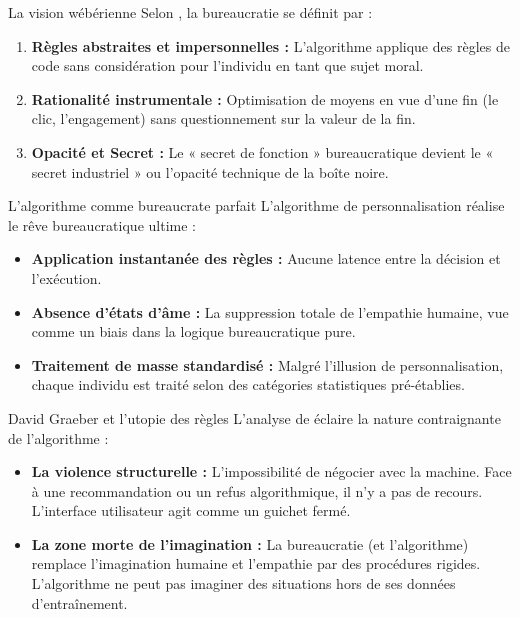 \documentclass[9pt, aspectratio=169]{beamer}
\begin{document}
\begin{frame}{La vision wébérienne}
    Selon \cite{Weber2007The}, la bureaucratie se définit par :
    \begin{enumerate}
        \item \textbf{Règles abstraites et impersonnelles :} L'algorithme applique des règles de code sans considération pour l'individu en tant que sujet moral.
        \item \textbf{Rationalité instrumentale :} Optimisation de moyens en vue d'une fin (le clic, l'engagement) sans questionnement sur la valeur de la fin.
        \item \textbf{Opacité et Secret :} Le « secret de fonction » bureaucratique devient le « secret industriel » ou l'opacité technique de la boîte noire.
    \end{enumerate}
\end{frame}

\begin{frame}{L'algorithme comme bureaucrate parfait}
    L'algorithme de personnalisation réalise le rêve bureaucratique ultime :
    \vspace{0.5cm}
    \begin{itemize}
        \item \textbf{Application instantanée des règles :} Aucune latence entre la décision et l'exécution.
        \item \textbf{Absence d'états d'âme :} La suppression totale de l'empathie humaine, vue comme un biais dans la logique bureaucratique pure.
        \item \textbf{Traitement de masse standardisé :} Malgré l'illusion de personnalisation, chaque individu est traité selon des catégories statistiques pré-établies.
    \end{itemize}
\end{frame}

\begin{frame}{David Graeber et l'utopie des règles}
    L'analyse de \cite{Graeber2015} éclaire la nature contraignante de l'algorithme :
    \begin{itemize}
        \item \textbf{La violence structurelle :} L'impossibilité de négocier avec la machine. Face à une recommandation ou un refus algorithmique, il n'y a pas de recours. L'interface utilisateur agit comme un guichet fermé.
        \item \textbf{La zone morte de l'imagination :} La bureaucratie (et l'algorithme) remplace l'imagination humaine et l'empathie par des procédures rigides. L'algorithme ne peut pas imaginer des situations hors de ses données d'entraînement.
    \end{itemize}
\end{frame}
\end{document}
